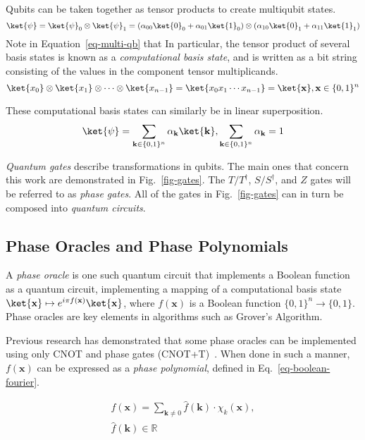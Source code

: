 Qubits can be taken together as tensor products to create multiqubit states.
\begin{equation}
\label{eq-multi-qb}
\ket{\psi} = \ket{\psi}_0 \otimes \ket{\psi}_1 =(\alpha_{00} \ket{0}_0 + \alpha_{01} \ket{1}_0) \otimes
(\alpha_{10} \ket{0}_1 + \alpha_{11} \ket{1}_1)
\end{equation}
Note in Equation~\ref{eq-multi-qb} that In particular, the tensor product of several basis states is known as a \emph{computational basis state},
and is written as a bit string consisting of the values in the component tensor multiplicands. 
\begin{equation}
\ket{x_0}\otimes\ket{x_1}\otimes\cdots\otimes\ket{x_{n-1}}=\ket{x_0 x_1 \cdots x_{n-1}}=\ket{\mathbf{x}},
\mathbf{x} \in \{0,1\}^n
\end{equation}

These computational basis states can similarly be in linear superposition.
\begin{equation}
\ket{\psi} = \sum_{\mathbf{k} \in \{0,1\}^n} \alpha_{\mathbf{k}}\ket{\mathbf{k}},
\sum_{\mathbf{k} \in \{0,1\}^n} \alpha_{\mathbf{k}} = 1
\end{equation}

{\it Quantum gates} describe transformations in qubits. The main ones that concern this work are demonstrated
in Fig.~\ref{fig-gates}. The $T/T^{\dagger}$, $S/S^{\dagger}$, and $Z$ gates will be referred to as {\it phase gates}.
All of the gates in Fig.~\ref{fig-gates} can in turn be composed into {\it quantum circuits}. 

\subsection{Phase Oracles and Phase Polynomials}
A {\it phase oracle} is one such quantum circuit that implements a Boolean function as a quantum circuit, implementing
a mapping of a computational basis state $\ket{\mathbf{x}} \mapsto e^{i \pi f(\mathbf{x})}\ket{\mathbf{x}}$, where $f(\mathbf{x})$
is a Boolean function $\{0,1\}^n \rightarrow \{0,1\}$. Phase oracles are key elements in algorithms such as
Grover's Algorithm.

Previous research has demonstrated that some phase oracles can be implemented using only CNOT and phase gates
(CNOT+T)~\cite{bib-amy-cnot}. When done in such a manner, $f(\mathbf{x})$ can be expressed as a {\it phase polynomial},
defined in Eq.~\ref{eq-boolean-fourier}.

\begin{equation}
  \begin{aligned}
    \label{eq-boolean-fourier}
    f(\mathbf{x}) = \sum_{\mathbf{k} \neq 0} \hat{f}(\mathbf{k}) \cdot \chi_k(\mathbf{x}), \\\nonumber
    \hat{f}(\mathbf{k}) \in \mathbb{R}
  \end{aligned}
\end{equation}

